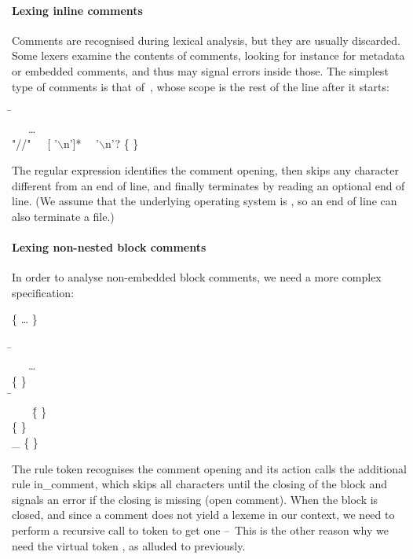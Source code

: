 \paragraph{Lexing inline comments}

Comments are recognised during lexical analysis, but they are usually
discarded. Some lexers examine the contents of comments, looking for
instance for metadata or embedded comments, and thus may signal errors
inside those. The simplest type of comments is that of~\Cpp{}, whose
scope is the rest of the line after it starts:
\begin{tabbing}
\Xrule \=  \equal \Xparse\\
\> \ \ \ \ldots\\
\> \vbar{} \textsf{"//"\ \ \ [ '\(\backslash\)n']*
  \ \ '\(\backslash\)n'?} \{   \}
\end{tabbing}
The regular expression identifies the comment opening, then skips any
character different from an end of line, and finally terminates by
reading an optional end of line. (We assume that the underlying
operating system is \Unix, so an end of line can also terminate a
file.)

\paragraph{Lexing non-nested block comments}

In order to analyse non\hyp{}embedded block comments, we need a more
complex specification:
\begin{tabbing}
\{ \ldots{} \Xexception {} \}\\
\\
\Xrule \=  \equal \Xparse\\
\> \ \ \ \ldots\\
\> \vbar{} \str{/*} \{   \}\\
\Xand \=  \equal \Xparse\\
\> \ \ \ \str{*/} \= \{   \}\\
\> \vbar{}  \> \{   \}\\
\> \vbar{} {\large \_} \> \{   \}
\end{tabbing}
The rule \textsf{token} recognises the comment opening and its action
calls the additional rule \textsf{in\_comment}, which skips all
characters until the closing of the block and signals an error if the
closing is missing (open comment). When the block is closed, and since
a comment does not yield a lexeme in our context, we need to perform a
recursive call to \textsf{token} to get one --~This is the other
reason why we need the virtual token \Teof, as alluded to previously.

